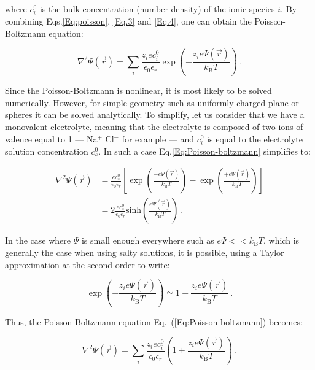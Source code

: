 where $c_i ^0$ is the bulk concentration (number density) of the ionic species $i$. By combining Eqs.\ref{Eq:poisson}, \ref{Eq.3} and \ref{Eq.4}, one can obtain the Poisson-Boltzmann equation:

\begin{equation}
	\nabla ^2 \Psi (\vec{r}) = \sum_i \frac{z_i e c_i^0}{\epsilon_0 \epsilon_r} \exp \left( - \frac{z_i e \Psi (\vec{r})}{k_\mathrm{B}T} \right) ~.
	\label{Eq:Poisson-boltzmann}
\end{equation}

Since the Poisson-Boltzmann is nonlinear, it is most likely to be solved numerically. However, for simple geometry such as uniformly charged plane or spheres it can be solved analytically. To simplify, let us consider that we have a monovalent electrolyte, meaning that the electrolyte is composed of two ions of valence equal to 1 --- Na$^+$ Cl$^-$ for example --- and $c_i ^0$ is equal to the electrolyte solution concentration $c_s^0$. In such a case Eq.\ref{Eq:Poisson-boltzmann} simplifies to:

\begin{equation}
	\begin{aligned}
		\nabla ^2 \Psi (\vec{r}) &= \frac{e c_s ^0}{\epsilon_0 \epsilon_r} \left[ \exp \left( \frac{-e\Psi(\vec{r})}{k_\mathrm{B}T} \right) -  \exp \left( \frac{+e\Psi(\vec{r})}{k_\mathrm{B}T} \right) \right] \\
		& = 2 \frac{e c_s ^0}{\epsilon_0 \epsilon_r} \mathrm{sinh}  \left( \frac{e\Psi(\vec{r})}{k_\mathrm{B}T} \right) ~.
	\end{aligned}
\end{equation}

In the case where $\Psi$ is small enough everywhere such as $e\Psi << k_\mathrm{B} T$, which is generally the case when using salty solutions, it is possible, using a Taylor approximation at the second order to write:

\begin{equation}
	\exp \left( - \frac{z_i e \Psi(\vec{r})}{k_\mathrm{B}T} \right) \simeq 1 + \frac{z_i e \Psi (\vec{r})}{k_\mathrm{B}T} ~.
\end{equation}

Thus, the Poisson-Boltzmann equation Eq.~(\ref{Eq:Poisson-boltzmann}) becomes:

\begin{equation}
	\nabla ^2 \Psi (\vec{r}) = \sum_i \frac{z_i e c_i^0}{\epsilon_0 \epsilon_r}  \left( 1 + \frac{z_i e \Psi (\vec{r})}{k_\mathrm{B}T} \right) ~.
\end{equation}

